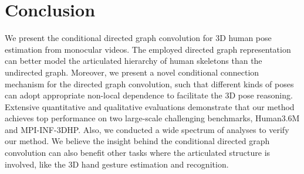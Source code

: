 \documentclass[sigconf]{acmart}
\begin{document}
 	
	\section{Conclusion}
	We present the conditional directed graph convolution for 3D human pose estimation from monocular videos.
The employed directed graph representation can better model the articulated hierarchy of human skeletons than the undirected graph.
Moreover, we present a novel conditional connection mechanism for the directed graph convolution, such that different kinds of poses can adopt appropriate non-local dependence to facilitate the 3D pose reasoning.
Extensive quantitative and qualitative evaluations demonstrate that our method achieves top performance on two large-scale challenging benchmarks, Human3.6M and MPI-INF-3DHP.
Also, we conducted a wide spectrum of analyses to verify our method.
We believe the insight behind the conditional directed graph convolution can also benefit other tasks where the articulated structure is involved, like the 3D hand gesture estimation and recognition.
	
\newpage
	
\vfill\eject


	
	
\end{document}
